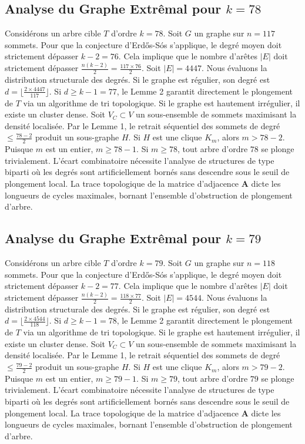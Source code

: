 \documentclass[11pt,a4paper]{article}
\begin{document}
\subsection{Analyse du Graphe Extr\^emal pour $k=78$}
Consid\'erons un arbre cible $T$ d'ordre $k=78$.
Soit $G$ un graphe sur $n=117$ sommets.
Pour que la conjecture d'Erd\H{o}s-S\'os s'applique, le degr\'e moyen doit strictement d\'epasser $k-2 = 76$.
Cela implique que le nombre d'ar\^etes $|E|$ doit strictement d\'epasser $\frac{n(k-2)}{2} = \frac{117 \times 76}{2}$.
Soit $|E| = 4447$.
Nous \'evaluons la distribution structurale des degr\'es. Si le graphe est r\'egulier, son degr\'e est $d = \lfloor \frac{2 \times 4447}{117} \rfloor$.
Si $d \geq k-1 = 77$, le Lemme 2 garantit directement le plongement de $T$ via un algorithme de tri topologique.
Si le graphe est hautement irr\'egulier, il existe un cluster dense. Soit $V_C \subset V$ un sous-ensemble de sommets maximisant la densit\'e localis\'ee.
Par le Lemme 1, le retrait s\'equentiel des sommets de degr\'e $\leq \frac{78-2}{2}$ produit un sous-graphe $H$.
Si $H$ est une clique $K_{m}$, alors $m > 78-2$. Puisque $m$ est un entier, $m \geq 78-1$. Si $m \geq 78$, tout arbre d'ordre $78$ se plonge trivialement.
L'\'ecart combinatoire n\'ecessite l'analyse de structures de type biparti o\`u les degr\'es sont artificiellement born\'es sans descendre sous le seuil de plongement local. La trace topologique de la matrice d'adjacence $\mathbf{A}$ dicte les longueurs de cycles maximales, bornant l'ensemble d'obstruction de plongement d'arbre.


\subsection{Analyse du Graphe Extr\^emal pour $k=79$}
Consid\'erons un arbre cible $T$ d'ordre $k=79$.
Soit $G$ un graphe sur $n=118$ sommets.
Pour que la conjecture d'Erd\H{o}s-S\'os s'applique, le degr\'e moyen doit strictement d\'epasser $k-2 = 77$.
Cela implique que le nombre d'ar\^etes $|E|$ doit strictement d\'epasser $\frac{n(k-2)}{2} = \frac{118 \times 77}{2}$.
Soit $|E| = 4544$.
Nous \'evaluons la distribution structurale des degr\'es. Si le graphe est r\'egulier, son degr\'e est $d = \lfloor \frac{2 \times 4544}{118} \rfloor$.
Si $d \geq k-1 = 78$, le Lemme 2 garantit directement le plongement de $T$ via un algorithme de tri topologique.
Si le graphe est hautement irr\'egulier, il existe un cluster dense. Soit $V_C \subset V$ un sous-ensemble de sommets maximisant la densit\'e localis\'ee.
Par le Lemme 1, le retrait s\'equentiel des sommets de degr\'e $\leq \frac{79-2}{2}$ produit un sous-graphe $H$.
Si $H$ est une clique $K_{m}$, alors $m > 79-2$. Puisque $m$ est un entier, $m \geq 79-1$. Si $m \geq 79$, tout arbre d'ordre $79$ se plonge trivialement.
L'\'ecart combinatoire n\'ecessite l'analyse de structures de type biparti o\`u les degr\'es sont artificiellement born\'es sans descendre sous le seuil de plongement local. La trace topologique de la matrice d'adjacence $\mathbf{A}$ dicte les longueurs de cycles maximales, bornant l'ensemble d'obstruction de plongement d'arbre.
\end{document}

